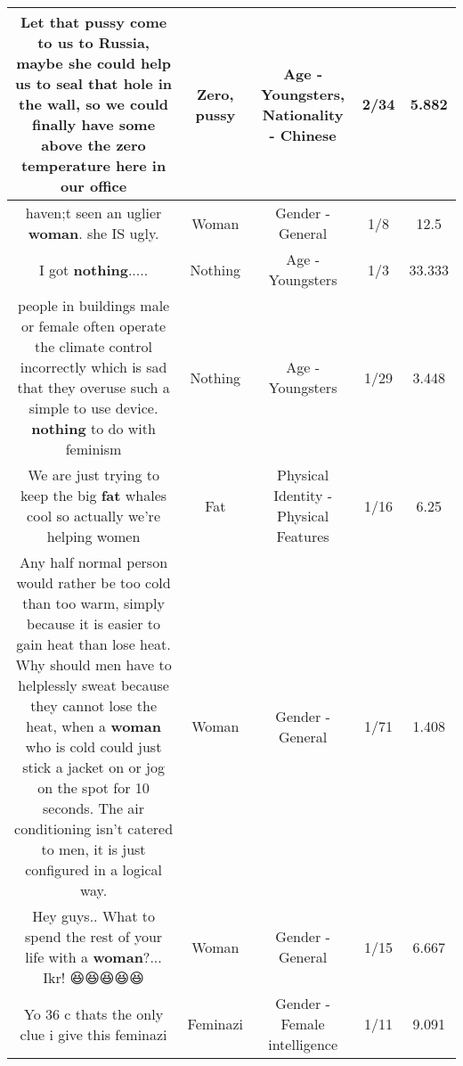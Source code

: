 \documentclass[11pt]{article}
\newlength\mylength
\begin{document}
\begin{center}
\begin{longtable}{|C{.65\mylength}|C{.30\mylength}|C{.12\mylength}|C{.12\mylength}|C{.12\mylength}|}
  \small Let that \textbf{pussy} come to us to Russia, maybe she could help us to seal that hole in the wall, so we could finally have some above the \textbf{zero} temperature here in our office\normalsize   & Zero, pussy & Age - Youngsters, Nationality - Chinese & 2/34 & 5.882 \\  \hline
  \small haven;t seen an uglier \textbf{woman}. she IS ugly.\normalsize   & Woman & Gender - General & 1/8 & 12.5 \\  \hline
  \small I got \textbf{nothing}.....\normalsize   & Nothing & Age - Youngsters & 1/3 & 33.333 \\  \hline
  \small people in buildings male or female often operate the climate control incorrectly which is sad that they overuse such a simple to use device. \textbf{nothing} to do with feminism\normalsize   & Nothing & Age - Youngsters & 1/29 & 3.448 \\  \hline
  \small We are just trying to keep the big \textbf{fat} whales cool so actually we're helping women\normalsize   & Fat & Physical Identity - Physical Features & 1/16 & 6.25 \\  \hline
  \small Any half normal person would rather be too cold than too warm, simply because it is easier to gain heat than lose heat. Why should men have to helplessly sweat because they cannot lose the heat, when a \textbf{woman} who is cold could just stick a jacket on or jog on the spot for 10 seconds. The air conditioning isn't catered to men, it is just configured in a logical way.\normalsize   & Woman & Gender - General & 1/71 & 1.408 \\  \hline
  \small Hey guys.. What to spend the rest of your life with a \textbf{woman}?... Ikr! 😆😆😆😆😆\normalsize   & Woman & Gender - General & 1/15 & 6.667 \\  \hline
  \small Yo 36 c thats the only clue i give this feminazi\normalsize   & Feminazi & Gender - Female intelligence & 1/11 & 9.091 \\  \hline

\end{longtable}
\end{center}
\end{document}
